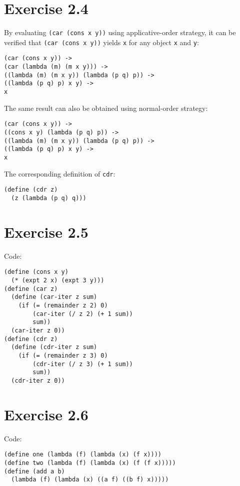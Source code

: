 \documentclass[../main.tex]{subfiles}
\begin{document}
\section{Exercise 2.4}

By evaluating \lstinline{(car (cons x y))} using
 applicative-order strategy, it can be verified
 that \lstinline{(car (cons x y))} yields
 \lstinline{x} for any object \lstinline{x} and
 \lstinline{y}:

\begin{lstlisting}
(car (cons x y)) ->
(car (lambda (m) (m x y))) ->
((lambda (m) (m x y)) (lambda (p q) p)) ->
((lambda (p q) p) x y) ->
x
\end{lstlisting}

The same result can also be obtained using
 normal-order strategy:

\begin{lstlisting}
(car (cons x y)) ->
((cons x y) (lambda (p q) p)) ->
((lambda (m) (m x y)) (lambda (p q) p)) ->
((lambda (p q) p) x y) ->
x
\end{lstlisting}

The corresponding definition of \lstinline{cdr}:

\begin{lstlisting}
(define (cdr z)
  (z (lambda (p q) q)))
\end{lstlisting}

\section{Exercise 2.5}

Code:

\begin{lstlisting}
(define (cons x y)
  (* (expt 2 x) (expt 3 y)))
(define (car z)
  (define (car-iter z sum)
    (if (= (remainder z 2) 0)
        (car-iter (/ z 2) (+ 1 sum))
        sum))
  (car-iter z 0))
(define (cdr z)
  (define (cdr-iter z sum)
    (if (= (remainder z 3) 0)
        (cdr-iter (/ z 3) (+ 1 sum))
        sum))
  (cdr-iter z 0))
\end{lstlisting}

\section{Exercise 2.6}

Code:

\begin{lstlisting}
(define one (lambda (f) (lambda (x) (f x))))
(define two (lambda (f) (lambda (x) (f (f x)))))
(define (add a b)
  (lambda (f) (lambda (x) ((a f) ((b f) x)))))
\end{lstlisting}
\end{document}
